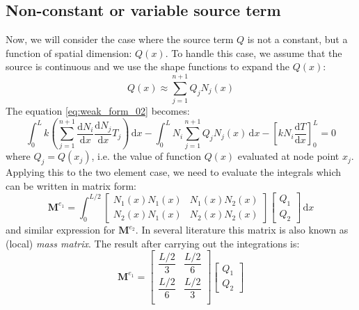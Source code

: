 \documentclass[a4paper,12pt]{article} %
\begin{document}
\subsection{Non-constant or variable source term}

Now, we will consider the case where the source term $Q$ is not a constant, but
a function of spatial dimension: $Q(x)$. To handle this case, we assume that the
source is continuous and we use the shape functions to expand the $Q(x)$:
\begin{equation}
Q(x) \approx \sum_{j=1}^{n+1} Q_{j} N_{j}(x)
\end{equation}
The equation \eqref{eq:weak_form_02} becomes:
\begin{equation}
\int_{0}^{L} k
\left( \sum_{j=1}^{n+1}
\frac{\mathrm{d} N_{i}}{\mathrm{d}x}
\frac{\mathrm{d}N_{j}}{\mathrm{d}x} T_{j} \right)\, \mathrm{d}x -
\int_{0}^{L} N_{i} \sum_{j=1}^{n+1} Q_{j} N_{j}(x) \, \mathrm{d}x -
\left[ k N_{i} \frac{\mathrm{d}T}{\mathrm{d}x} \right]_{0}^{L} = 0
\label{eq:weak_form_03}
\end{equation}
where $Q_{j} = Q(x_{j})$, i.e. the value of function $Q(x)$ evaluated
at node point $x_{j}$.
Applying this to the two element case, we need to evaluate the integrals which
can be written in matrix form:
\begin{equation}
\mathbf{M}^{e_1} =
\int_{0}^{L/2} \begin{bmatrix}
N_{1}(x) N_{1}(x) & N_{1}(x) N_{2}(x) \\
N_{2}(x) N_{1}(x) & N_{2}(x) N_{2}(x)
\end{bmatrix}
\begin{bmatrix} Q_{1} \\ Q_{2} \end{bmatrix}
 \, \mathrm{d}x
\end{equation}
and similar expression for $\mathbf{M}^{e_2}$. In several literature this matrix
is also known as (local) \textit{mass matrix}.
The result after carrying out the integrations is:
\begin{equation}
\mathbf{M}^{e_1} = \begin{bmatrix}
\dfrac{L/2}{3} & \dfrac{L/2}{6} \\[10pt]
\dfrac{L/2}{6} & \dfrac{L/2}{3} \\
\end{bmatrix}\begin{bmatrix}
Q_{1} \\[10pt] Q_{2}
\end{bmatrix}
\end{equation}
\end{document}

